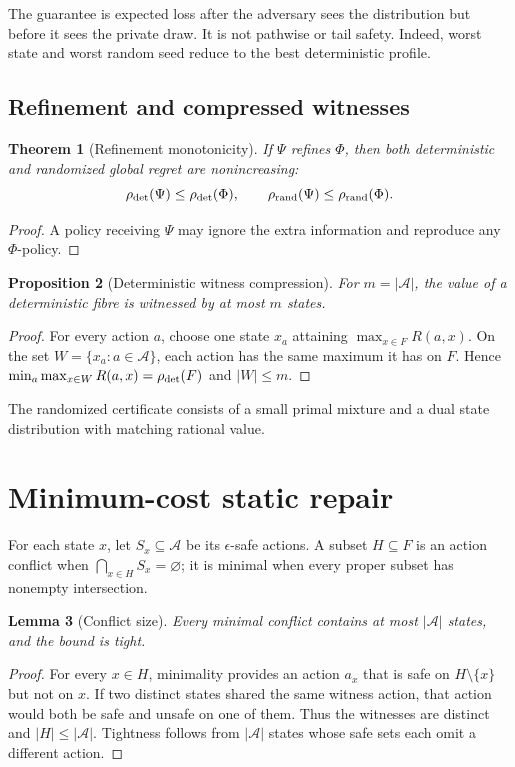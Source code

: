 \documentclass[11pt]{article}
\newtheorem{theorem}{Theorem}
\newtheorem{proposition}[theorem]{Proposition}
\newtheorem{lemma}[theorem]{Lemma}
\theoremstyle{definition}
\theoremstyle{remark}
\newcommand{\A}{\mathcal A}
\begin{document}
The guarantee is expected loss after the adversary sees the distribution but before it sees the private draw.  It is not pathwise or tail safety.  Indeed, worst state and worst random seed reduce to the best deterministic profile.

\subsection{Refinement and compressed witnesses}

\begin{theorem}[Refinement monotonicity]
If $\Psi$ refines $\Phi$, then both deterministic and randomized global regret are nonincreasing:
\[
 \rho_{\rm det}(\Psi)\le\rho_{\rm det}(\Phi),\qquad
 \rho_{\rm rand}(\Psi)\le\rho_{\rm rand}(\Phi).
\]
\end{theorem}
\begin{proof}
A policy receiving $\Psi$ may ignore the extra information and reproduce any $\Phi$-policy.
\end{proof}

\begin{proposition}[Deterministic witness compression]\label{prop:witness}
For $m=|\A|$, the value of a deterministic fibre is witnessed by at most $m$ states.
\end{proposition}
\begin{proof}
For every action $a$, choose one state $x_a$ attaining $\max_{x\in F}R(a,x)$.  On the set $W=\{x_a:a\in\A\}$, each action has the same maximum it has on $F$.  Hence $\min_a\max_{x\in W}R(a,x)=\rho_{\rm det}(F)$ and $|W|\le m$.
\end{proof}

The randomized certificate consists of a small primal mixture and a dual state distribution with matching rational value.

\section{Minimum-cost static repair}

For each state $x$, let $S_x\subseteq\A$ be its $\epsilon$-safe actions.  A subset $H\subseteq F$ is an action conflict when $\bigcap_{x\in H}S_x=\varnothing$; it is minimal when every proper subset has nonempty intersection.

\begin{lemma}[Conflict size]
Every minimal conflict contains at most $|\A|$ states, and the bound is tight.
\end{lemma}
\begin{proof}
For every $x\in H$, minimality provides an action $a_x$ that is safe on $H\setminus\{x\}$ but not on $x$.  If two distinct states shared the same witness action, that action would both be safe and unsafe on one of them.  Thus the witnesses are distinct and $|H|\le|\A|$.  Tightness follows from $|\A|$ states whose safe sets each omit a different action.
\end{proof}
\end{document}
